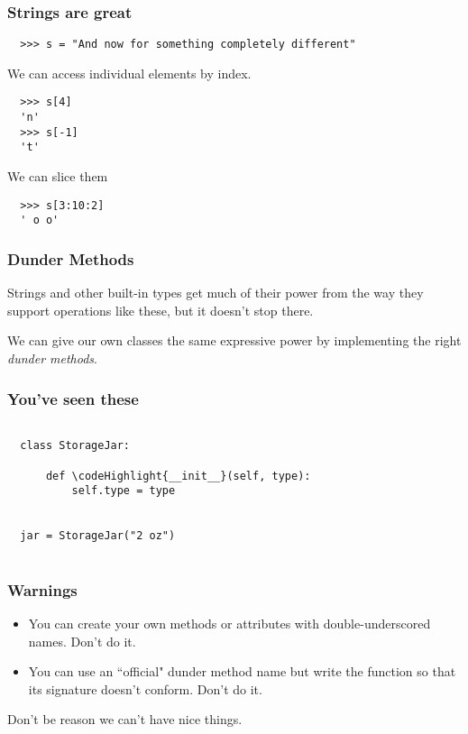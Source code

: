 \documentclass[aspectratio=169]{beamer}
\newcommand\codeHighlight[1]{\textcolor[rgb]{1,0,0}{\textbf{#1}}}
\begin{document}
\begin{frame}[fragile]
  \frametitle{Strings are great}
  
  \begin{verbatim}
  >>> s = "And now for something completely different"
  \end{verbatim}  
  We can access individual elements by index.
  \begin{verbatim}
  >>> s[4]
  'n'
  >>> s[-1]
  't'
  \end{verbatim}  
  We can slice them
  \begin{verbatim}
  >>> s[3:10:2]
  ' o o'
  \end{verbatim}
  
  \end{frame}

\begin{frame}
  \frametitle{Dunder Methods}
  
  Strings and other built-in types get much of their power from the way
  they support operations like these, but it doesn't stop there.
  
  \bigbreak
  
  We can give our own classes the same expressive power by implementing the right
  \emph{dunder methods}.
  \end{frame}
  
\begin{frame}[fragile]
  \frametitle{You've seen these}
  
  \begin{Verbatim}[commandchars=\\\{\}]
  
  class StorageJar:
      
      def \codeHighlight{__init__}(self, type):
          self.type = type
          
  
  jar = StorageJar("2 oz")         
  
  \end{Verbatim}
  \end{frame}
  
\begin{frame}
  \frametitle{Warnings}
  
  \begin{itemize}
    \item You can create your own methods or attributes with double-underscored names. Don't do it.
    \item You can use an ``official" dunder method name but write the function so that its signature doesn't conform. Don't do it.
  \end{itemize}  
  
  Don't be reason we can't have nice things.
  \end{frame}
  
\end{document}
